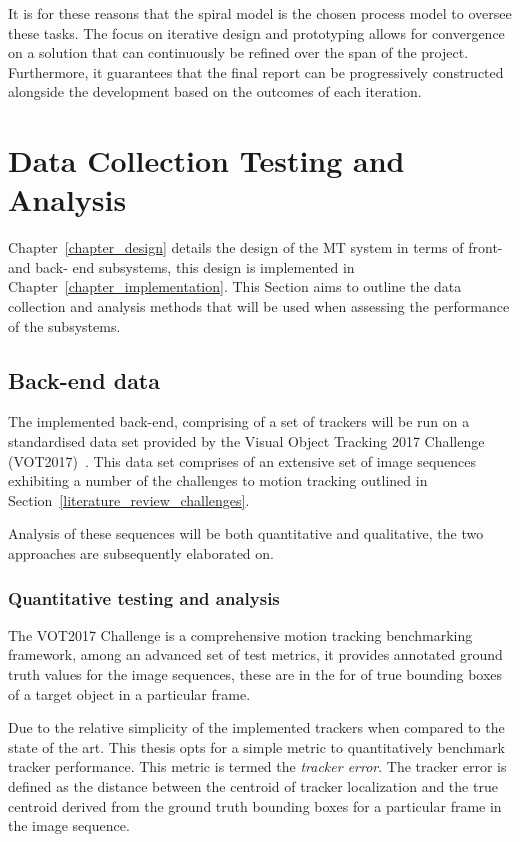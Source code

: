 It is for these reasons that the spiral model is the chosen process model to
oversee these tasks. The focus on iterative design and prototyping allows for
convergence on a solution that can continuously be refined over the span of the
project. Furthermore, it guarantees that the final report can be progressively
constructed alongside the development based on the outcomes of each iteration.

\section{Data Collection Testing and Analysis}\label{methodology_testing}
Chapter~\ref{chapter_design} details the design of the MT system in terms of
front- and back- end subsystems, this design is implemented in
Chapter~\ref{chapter_implementation}. This Section aims to outline the data
collection and analysis methods that will be used when assessing the
performance of the subsystems.

\subsection{Back-end data}
The implemented back-end, comprising of a set of trackers will be run on a
standardised data set provided by the Visual Object Tracking 2017 Challenge
(VOT2017)~\cite{VOT2017}. This data set comprises of an extensive set of image
sequences exhibiting a number of the challenges to motion tracking outlined in
Section~\ref{literature_review_challenges}. 

Analysis of these sequences will be both quantitative and qualitative, the two
approaches are subsequently elaborated on.

\subsubsection{Quantitative testing and analysis}
The VOT2017 Challenge is a comprehensive motion tracking benchmarking framework,
among an advanced set of test metrics, it provides annotated ground truth values for the
image sequences, these are in the for of true bounding boxes of a target object in a
particular frame. 

Due to the relative simplicity of the implemented trackers when compared to the
state of the art. This thesis opts for a simple metric to quantitatively
benchmark tracker performance. This metric is termed the \textit{tracker
error}.
The tracker error is defined as the distance between the centroid of tracker
localization and the true centroid derived from the ground truth bounding boxes
for a particular frame in the image sequence.


